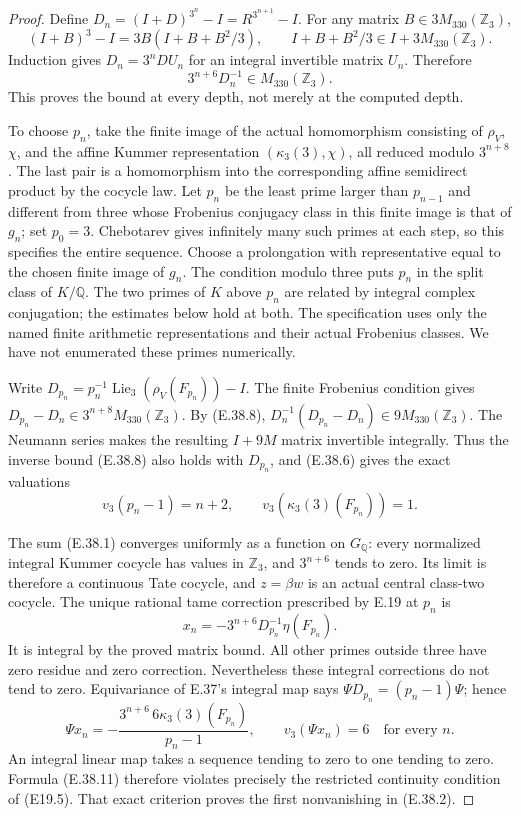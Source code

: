\begin{proof}
Define
$D_n=(I+D)^{3^n}-I=R^{3^{n+1}}-I$.
For any matrix $B\in3M_{330}(\mathbb Z_3)$,
\[
 (I+B)^3-I=3B(I+B+B^2/3),
          \qquad I+B+B^2/3\in I+3M_{330}(\mathbb Z_3).
\]
Induction gives $D_n=3^nD U_n$ for an
integral invertible matrix $U_n$.
Therefore
\[
                        3^{n+6}D_n^{-1}
                             \in M_{330}(\mathbb Z_3).
 \tag{E.38.8}
\]
This proves the bound at every depth,
not merely at the computed depth.

To choose $p_n$, take the finite image
of the actual homomorphism consisting
of $\rho_V$, $\chi$, and the affine
Kummer representation $(\kappa_3(3),\chi)$,
all reduced modulo $3^{n+8}$.
The last pair is a homomorphism into
the corresponding affine semidirect
product by the cocycle law. Let $p_n$
be the least prime larger than $p_{n-1}$
and different from three whose Frobenius
conjugacy class in this finite image
is that of $g_n$; set $p_0=3$.
Chebotarev gives infinitely many such
primes at each step, so this specifies
the entire sequence. Choose a
prolongation with representative equal
to the chosen finite image of $g_n$.
The condition modulo three puts $p_n$
in the split class of $K/\mathbb Q$.
The two primes of $K$ above $p_n$ are
related by integral complex conjugation;
the estimates below hold at both.
The specification uses only the named
finite arithmetic representations and
their actual Frobenius classes. We have
not enumerated these primes numerically.

Write
$D_{p_n}=p_n^{-1}\operatorname{Lie}_3
(\rho_V(F_{p_n}))-I$.
The finite Frobenius condition gives
$D_{p_n}-D_n\in3^{n+8}M_{330}(\mathbb Z_3)$.
By (E.38.8),
$D_n^{-1}(D_{p_n}-D_n)\in9M_{330}(\mathbb Z_3)$.
The Neumann series makes the resulting
$I+9M$ matrix invertible integrally.
Thus the inverse bound (E.38.8) also
holds with $D_{p_n}$, and (E.38.6)
gives the exact valuations
\[
 v_3(p_n-1)=n+2,
 \qquad v_3(\kappa_3(3)(F_{p_n}))=1.
 \tag{E.38.9}
\]

The sum (E.38.1) converges uniformly
as a function on $G_{\mathbb Q}$:
every normalized integral Kummer
cocycle has values in $\mathbb Z_3$,
and $3^{n+6}$ tends to zero. Its limit
is therefore a continuous Tate cocycle,
and $z=\beta w$ is an actual central
class-two cocycle. The unique rational
tame correction prescribed by E.19
at $p_n$ is
\[
 x_n=-3^{n+6}D_{p_n}^{-1}\eta(F_{p_n}).
 \tag{E.38.10}
\]
It is integral by the proved matrix
bound. All other primes outside three
have zero residue and zero correction.
Nevertheless these integral corrections
do not tend to zero. Equivariance of
E.37's integral map says
$\Psi D_{p_n}=(p_n-1)\Psi$; hence
\[
 \Psi x_n=-\frac{3^{n+6}\,6\kappa_3(3)(F_{p_n})}
                            {p_n-1},
       \qquad v_3(\Psi x_n)=6
                  \quad\text{for every }n.
 \tag{E.38.11}
\]
An integral linear map takes a sequence
tending to zero to one tending to
zero. Formula (E.38.11) therefore
violates precisely the restricted
continuity condition of (E19.5).
That exact criterion proves the first
nonvanishing in (E.38.2).


\end{proof}
